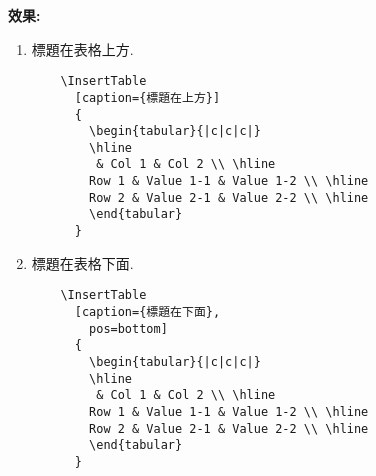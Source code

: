   \newpage
  {\bf 效果:}
  \begin{enumerate}


  \item
  {
    標題在表格上方.
    \begin{verbatim}
    \InsertTable
      [caption={標題在上方}]
      {
        \begin{tabular}{|c|c|c|}
        \hline
         & Col 1 & Col 2 \\ \hline
        Row 1 & Value 1-1 & Value 1-2 \\ \hline
        Row 2 & Value 2-1 & Value 2-2 \\ \hline
        \end{tabular}
      }
    \end{verbatim}

  } %


  \newpage
  \item
  {
    標題在表格下面.
    \begin{verbatim}
    \InsertTable
      [caption={標題在下面},
        pos=bottom]
      {
        \begin{tabular}{|c|c|c|}
        \hline
         & Col 1 & Col 2 \\ \hline
        Row 1 & Value 1-1 & Value 1-2 \\ \hline
        Row 2 & Value 2-1 & Value 2-2 \\ \hline
        \end{tabular}
      }
    \end{verbatim}

  } %


\end{enumerate}
